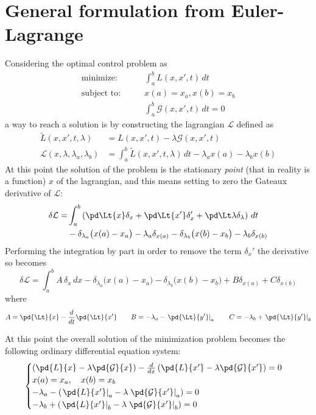 \section{General formulation from Euler-Lagrange}
Considering the optimal control problem as
\begin{equation} \begin{aligned}
		\textrm{minimize:} \qquad & \int_a^b  L (x,x',t)\, dt \\
		\textrm{subject to:}\qquad & x(a) = x_a, x(b) =x_b \\
		& \int_a^b \mathcal G(x,x',t)\,dt = 0
\end{aligned} \end{equation}
a way to reach a solution is by constructing the lagrangian $\mathcal L $ defined as
\begin{equation}
	\begin{aligned}
		\tilde{ L }(x,x',t, \lambda) &  =  L (x,x',t) - \lambda \mathcal G(x,x',t) \\
		\mathcal L  (x,\lambda,\lambda_a,\lambda_b) & = \int_a^b \tilde{ L }(x,x',t,\lambda)\,dt - \lambda_a x(a) - \lambda_b x(b)
	\end{aligned}
\end{equation}
At this point the solution of the problem is the stationary \textit{point} (that in reality is a function) $x$ of the lagrangian, and this means setting to zero the Gateaux derivative of $\mathcal L $:
\begin{align*}
	\delta \mathcal L  = &  \int_a^b \left( \pd \Lt{x} \delta_x + \pd \Lt {x'} \delta_x' + \pd \Lt \lambda \delta_\lambda \right)\, dt \\ & - \delta_{\lambda_a} \big(x(a)-x_a\big) - \lambda_a \delta_{x(a)} - \delta_{\lambda_b} \big(x(b)-x_b\big) - \lambda_b \delta_{x(b)}
\end{align*}
Performing the integration by part in order to remove the term $\delta_x'$ the derivative so becomes
\[ \delta \mathcal L  = \int_a^b A\,\delta_x\, dx - \delta_{\lambda_a} \big(x(a)-x_a\big) - \delta_{\lambda_b}\big(x(b)-x_b\big) + B \delta_{x(a)} + C\delta_{x(b)} \]
where
\[ A = \pd{\Lt}{x} - \frac d{dt}\pd{\Lt}{x'} \qquad B = -\lambda_a  -\left.\pd{\Lt}{y'} \right|_a  \qquad C = -\lambda_b  + \left. \pd{\Lt}{y'} \right|_b \]

At this point the overall solution of the minimization problem becomes the following ordinary differential equation system:
\begin{equation}
	\begin{cases}
		\left(\pd{ L }{x} - \lambda \pd{\mathcal G}{x} \right) - \frac d{dx}
		\left(\pd{ L }{x'} - \lambda \pd{\mathcal G}{x'} \right) = 0 \\
		x(a) = x_a, \quad x(b) = x_b \\
		-\lambda_a - \left( \left.\pd{ L }{x'}\right|_a - \lambda \left. \pd{\mathcal G}{x'} \right|_a \right) = 0\\
		-\lambda_b + \left( \left.\pd{ L }{x'}\right|_b - \lambda \left. \pd{\mathcal G}{x'} \right|_b \right) = 0
	\end{cases}
\end{equation}

